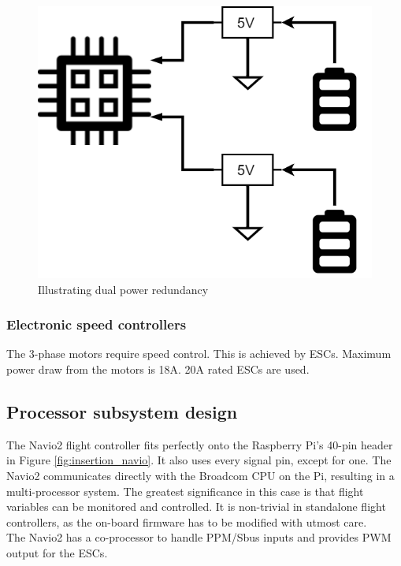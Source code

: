 \begin{figure}[H]
\centering
\includegraphics[scale=0.35]{images/dual_redundancy.png}
\caption{Illustrating dual power redundancy}
\label{fig:dual_redundancy}
\end{figure}

\subsubsection{Electronic speed controllers}

The 3-phase motors require speed control. This is achieved by ESCs. Maximum power draw from the motors is 18A. 20A rated ESCs are used.

\subsection{Processor subsystem design}

The Navio2 flight controller fits perfectly onto the Raspberry Pi's 40-pin header in Figure \ref{fig:insertion_navio}. It also uses every signal pin, except for one. The Navio2 communicates directly with the Broadcom CPU on the Pi, resulting in a multi-processor system. The greatest significance in this case is that flight variables can be monitored and controlled. It is non-trivial in standalone flight controllers, as the on-board firmware has to be modified with utmost care.\\

The Navio2 has a co-processor to handle PPM/Sbus inputs and provides PWM output for the ESCs.

